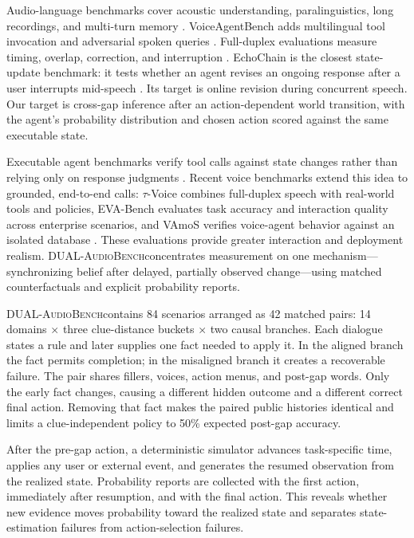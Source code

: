 \documentclass{article}
\newcommand{\benchmark}{\textsc{DUAL-AudioBench}}
\newcommand{\numscenarios}{84}
\newcommand{\numpairs}{42}
\newcommand{\numdomains}{14}
\begin{document}
Audio-language benchmarks cover acoustic understanding, paralinguistics, long recordings, and multi-turn memory \citep{yang2024airbench,wang2024audiobench,li2026wavbench,gosa2025audiomultichallenge}. VoiceAgentBench adds multilingual tool invocation and adversarial spoken queries \citep{jain2025voiceagentbench}. Full-duplex evaluations measure timing, overlap, correction, and interruption \citep{lin2025fullduplex,lin2025fullduplexv2,ge2025flexi}. EchoChain is the closest state-update benchmark: it tests whether an agent revises an ongoing response after a user interrupts mid-speech \citep{modi2026echochain}. Its target is online revision during concurrent speech. Our target is cross-gap inference after an action-dependent world transition, with the agent's probability distribution and chosen action scored against the same executable state.

Executable agent benchmarks verify tool calls against state changes rather than relying only on response judgments \citep{lu2024toolsandbox,yao2024taubench,barres2025tau2}. Recent voice benchmarks extend this idea to grounded, end-to-end calls: $\tau$-Voice combines full-duplex speech with real-world tools and policies, EVA-Bench evaluates task accuracy and interaction quality across enterprise scenarios, and VAmoS verifies voice-agent behavior against an isolated database \citep{ray2026tauvoice,bogavelli2026evabench,meyer2026vamos}. These evaluations provide greater interaction and deployment realism. \benchmark concentrates measurement on one mechanism---synchronizing belief after delayed, partially observed change---using matched counterfactuals and explicit probability reports.

\benchmark contains \numscenarios{} scenarios arranged as \numpairs{} matched pairs: \numdomains{} domains $\times$ three clue-distance buckets $\times$ two causal branches. Each dialogue states a rule and later supplies one fact needed to apply it. In the aligned branch the fact permits completion; in the misaligned branch it creates a recoverable failure. The pair shares fillers, voices, action menus, and post-gap words. Only the early fact changes, causing a different hidden outcome and a different correct final action. Removing that fact makes the paired public histories identical and limits a clue-independent policy to 50\% expected post-gap accuracy.

After the pre-gap action, a deterministic simulator advances task-specific time, applies any user or external event, and generates the resumed observation from the realized state. Probability reports are collected with the first action, immediately after resumption, and with the final action. This reveals whether new evidence moves probability toward the realized state and separates state-estimation failures from action-selection failures.
\end{document}
